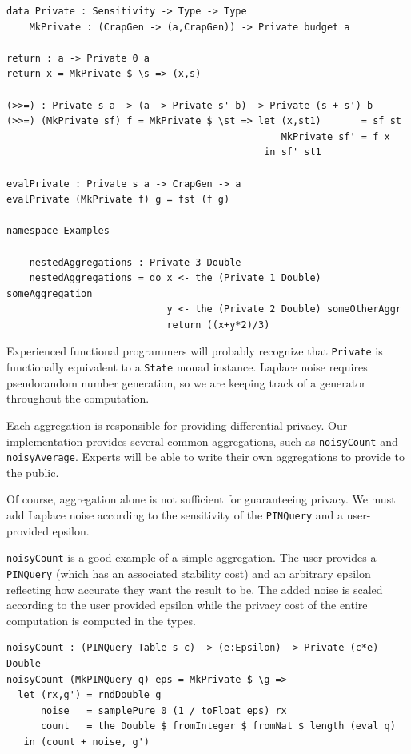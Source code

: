 \documentclass[12pt]{article}
\begin{document}
\begin{lstlisting}
data Private : Sensitivity -> Type -> Type
    MkPrivate : (CrapGen -> (a,CrapGen)) -> Private budget a

return : a -> Private 0 a
return x = MkPrivate $ \s => (x,s)

(>>=) : Private s a -> (a -> Private s' b) -> Private (s + s') b
(>>=) (MkPrivate sf) f = MkPrivate $ \st => let (x,st1)       = sf st
                                                MkPrivate sf' = f x
                                             in sf' st1

evalPrivate : Private s a -> CrapGen -> a
evalPrivate (MkPrivate f) g = fst (f g)

namespace Examples

    nestedAggregations : Private 3 Double
    nestedAggregations = do x <- the (Private 1 Double) someAggregation
                            y <- the (Private 2 Double) someOtherAggr
                            return ((x+y*2)/3)
\end{lstlisting}

Experienced functional programmers will probably recognize that \texttt{Private} is functionally equivalent to a \texttt{State} monad instance.
Laplace noise requires pseudorandom number generation, so we are keeping track of a generator throughout the computation.

Each aggregation is responsible for providing differential privacy.
Our implementation provides several common aggregations, such as \texttt{noisyCount} and \texttt{noisyAverage}.
Experts will be able to write their own aggregations to provide to the public.

Of course, aggregation alone is not sufficient for guaranteeing privacy.
We must add Laplace noise according to the sensitivity of the \texttt{PINQuery} and a user-provided epsilon.

\texttt{noisyCount} is a good example of a simple aggregation.
The user provides a \texttt{PINQuery} (which has an associated stability cost) and an arbitrary epsilon reflecting how accurate they want the result to be.
The added noise is scaled according to the user provided epsilon while the privacy cost of the entire computation is computed in the types.

\begin{lstlisting}
noisyCount : (PINQuery Table s c) -> (e:Epsilon) -> Private (c*e) Double
noisyCount (MkPINQuery q) eps = MkPrivate $ \g => 
  let (rx,g') = rndDouble g
      noise   = samplePure 0 (1 / toFloat eps) rx
      count   = the Double $ fromInteger $ fromNat $ length (eval q)
   in (count + noise, g')
\end{lstlisting}
\end{document}
